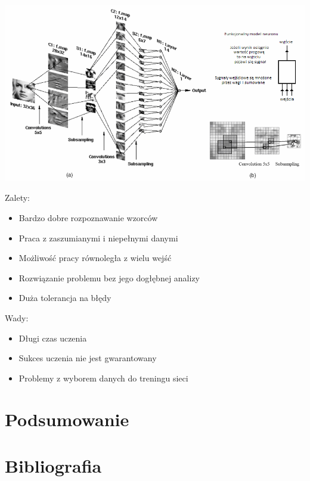 \documentclass[11pt,a4paper]{article}
\begin{document}
\vspace*{1cm}
\includegraphics[scale=0.65]{cnn.png}
\vspace*{1cm}

\noindent 
Zalety:
\begin{itemize}
\item  Bardzo dobre rozpoznawanie wzorców
\item  Praca z zaszumianymi i niepełnymi danymi
\item  Możliwość pracy równoległa z wielu wejść
\item  Rozwiązanie problemu bez jego dogłębnej analizy
\item  Duża tolerancja na błędy
\end{itemize}

\noindent 
Wady:
\begin{itemize}
\item  Długi czas uczenia 
\item  Sukces uczenia nie jest gwarantowany 
\item  Problemy z wyborem danych do treningu sieci 
\end{itemize}

\section{Podsumowanie}

\section{Bibliografia}


\end{document}
